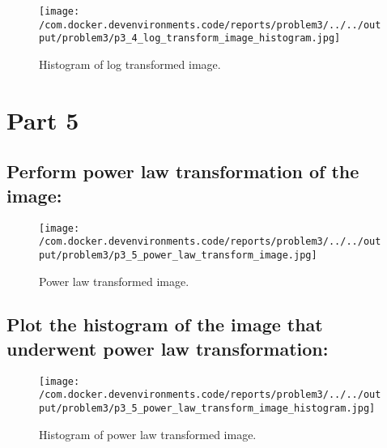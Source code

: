 \documentclass{article}%
\begin{document}
\begin{figure}[h!]%
\centering%
\texttt{[image: /com.docker.devenvironments.code/reports/problem3/../../output/problem3/p3\_4\_log\_transform\_image\_histogram.jpg]}%
\caption{Histogram of log transformed image.}%
\end{figure}

%
\section{Part 5}%
\label{sec:Part5}%
\subsection{Perform power law transformation of the image:}%
\label{subsec:Performpowerlawtransformationoftheimage}%


\begin{figure}[h!]%
\centering%
\texttt{[image: /com.docker.devenvironments.code/reports/problem3/../../output/problem3/p3\_5\_power\_law\_transform\_image.jpg]}%
\caption{Power law transformed image.}%
\end{figure}

%
\subsection{Plot the histogram of the image that underwent power law transformation:}%
\label{subsec:Plotthehistogramoftheimagethatunderwentpowerlawtransformation}%


\begin{figure}[h!]%
\centering%
\texttt{[image: /com.docker.devenvironments.code/reports/problem3/../../output/problem3/p3\_5\_power\_law\_transform\_image\_histogram.jpg]}%
\caption{Histogram of power law transformed image.}%
\end{figure}

%
\end{document}
